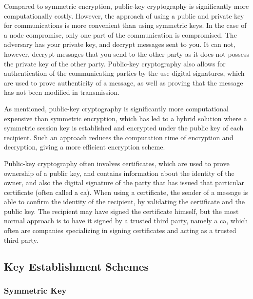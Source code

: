 Compared to symmetric encryption, public-key cryptography is significantly more computationally costly. However, the approach of using a public and private key for communications is more convenient than using symmetric keys. In the case of a node compromise, only one part of the communication is compromised. The adversary has your private key, and decrypt messages sent to you. It can not, however, decrypt messages that you send to the other party as it does not possess the private key of the other party. Public-key cryptography also allows for authentication of the communicating parties by the use digital signatures, which are used to prove authenticity of a message, as well as proving that the message has not been modified in transmission.


As mentioned, public-key cryptography is significantly more computational expensive than symmetric encryption, which has led to a hybrid solution where a symmetric session key is established and encrypted under the public key of each recipient. Such an approach reduces the computation time of encryption and decryption, giving a more efficient encryption scheme.

Public-key cryptography often involves certificates, which are used to prove ownership of a public key, and contains information about the identity of the owner, and also the digital signature of the party that has issued that particular certificate (often called a \gls{ca}). When using a certificate, the sender of a message is able to confirm the identity of the recipient, by validating the certificate and the public key. The recipient may have signed the certificate himself, but the most normal approach is to have it signed by a trusted third party, namely a \gls{ca}, which often are companies specializing in signing certificates and acting as a trusted third party.

\subsection{Key Establishment Schemes}


\subsubsection{Symmetric Key}

